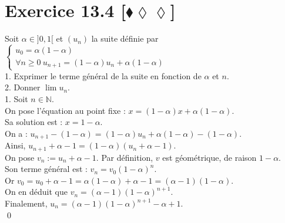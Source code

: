 \documentclass[10pt]{article}
\begin{document}

\section*{Exercice 13.4 [$\blacklozenge\lozenge\lozenge$]}
\begin{tcolorbox}[enhanced, width=7.6in, center, size=fbox, fontupper=\large, drop shadow southwest]
    Soit $\alpha\in]0,1[$ et $(u_n)$ la suite définie par $\begin{cases}
        u_0 = \alpha(1-\alpha)\\
        \forall n \geq 0 ~ u_{n+1}=(1-\alpha)u_n + \alpha(1-\alpha)
    \end{cases}$\\
    1. Exprimer le terme général de la suite en fonction de $\alpha$ et $n$.\\
    2. Donner $\lim u_n$.\\[0.1cm]
    1. Soit $n\in\mathbb{N}$.\\
    On pose l'équation au point fixe : $x = (1-\alpha)x + \alpha(1-\alpha)$.\\
    Sa solution est : $x=1-\alpha$.\\
    On a : $u_{n+1} - (1 - \alpha) = (1-\alpha)u_n + \alpha(1-\alpha) - (1 - \alpha)$.\\
    Ainsi, $u_{n+1} + \alpha - 1 = (1-\alpha)(u_n + \alpha - 1)$.\\
    On pose $v_n := u_n + \alpha - 1$. Par définition, $v$ est géométrique, de raison $1-\alpha$.\\
    Son terme général est : $v_n=v_0(1-\alpha)^n$.\\
    Or $v_0=u_0 + \alpha - 1 = \alpha(1-\alpha) + \alpha - 1 = (\alpha-1)(1-\alpha)$.\\
    On en déduit que $v_n = (\alpha-1)(1-\alpha)^{n+1}$.\\
    Finalement, $u_n=(\alpha-1)(1-\alpha)^{n+1}-\alpha+1$.\\
    \qed
\end{tcolorbox}

\end{document}
